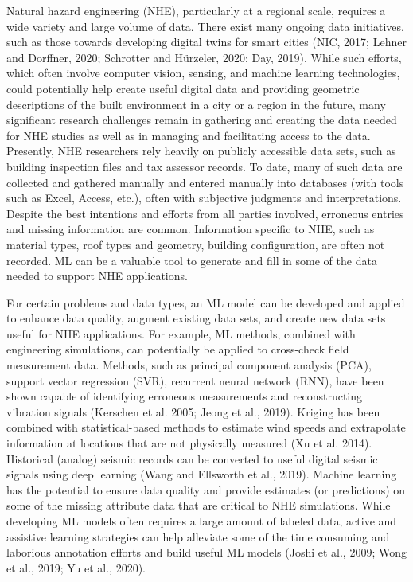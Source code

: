 Natural hazard engineering (NHE), particularly at a regional scale, requires a wide variety and large volume of data. There exist many ongoing data initiatives, such as those towards developing digital twins for smart cities (NIC, 2017; Lehner and Dorffner, 2020; Schrotter and Hürzeler, 2020; Day, 2019). While such efforts, which often involve computer vision, sensing, and machine learning technologies, could potentially help create useful digital data and providing geometric descriptions of the built environment in a city or a region in the future, many significant research challenges remain in gathering and creating the data needed for NHE studies as well as in managing and facilitating access to the data. Presently, NHE researchers rely heavily on publicly accessible data sets, such as building inspection files and tax assessor records. To date, many of such data are collected and gathered manually and entered manually into databases (with tools such as Excel, Access, etc.), often with subjective judgments and interpretations. Despite the best intentions and efforts from all parties involved, erroneous entries and missing information are common. Information specific to NHE, such as material types, roof types and geometry, building configuration, are often not recorded. ML can be a valuable tool to generate and fill in some of the data needed to support NHE applications. 

For certain problems and data types, an ML model can be developed and applied to enhance data quality, augment existing data sets, and create new data sets useful for NHE applications. For example, ML methods, combined with engineering simulations, can potentially be applied to cross-check field measurement data. Methods, such as principal component analysis (PCA), support vector regression (SVR), recurrent neural network (RNN), have been shown capable of identifying erroneous measurements and reconstructing vibration signals (Kerschen et al. 2005; Jeong et al., 2019). Kriging has been combined with statistical-based methods to estimate wind speeds and extrapolate information at locations that are not physically measured (Xu et al. 2014). Historical (analog) seismic records can be converted to useful digital seismic signals using deep learning (Wang and Ellsworth et al., 2019). Machine learning has the potential to ensure data quality and provide estimates (or predictions) on some of the missing attribute data that are critical to NHE simulations. While developing ML models often requires a large amount of labeled data, active and assistive learning strategies can help alleviate some of the time consuming and laborious annotation efforts and build useful ML models (Joshi et al., 2009; Wong et al., 2019; Yu et al., 2020). 

